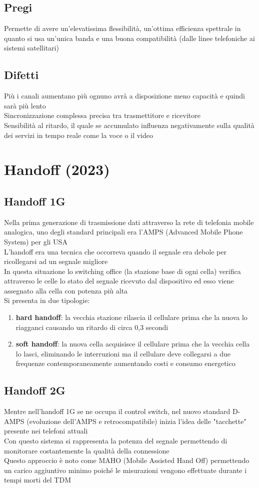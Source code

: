 \documentclass[10pt,oneside,a4paper]{article}
\begin{document}
\subsection{Pregi}
Permette di avere un'elevatissima flessibilità, un'ottima efficienza spettrale in quanto si usa un'unica banda e una buona compatibilità (dalle linee telefoniche ai sistemi satellitari)
\subsection{Difetti}
Più i canali aumentano più ognuno avrà a disposizione meno capacità e quindi sarà più lento\\
Sincronizzazione complessa precisa tra trasmettitore e ricevitore\\
Sensibilità al ritardo, il quale se accumulato influenza negativamente sulla qualità dei servizi in tempo reale come la voce o il video
\section{Handoff (2023)}
\subsection{Handoff 1G}
Nella prima generazione di trasmissione dati attraverso la rete di telefonia mobile analogica, uno degli standard principali era l'AMPS (Advanced Mobile Phone System) per gli USA\\
L'handoff era una tecnica che occorreva quando il segnale era debole per ricollegarsi ad un segnale migliore\\
In questa situazione lo switching office (la stazione base di ogni cella) verifica attraverso le celle lo stato del segnale ricevuto dal dispositivo ed esso viene assegnato alla cella con potenza più alta\\
Si presenta in due tipologie:
\begin{enumerate}
\item \textbf{hard handoff}: la vecchia stazione rilascia il cellulare prima che la nuova lo riagganci causando un ritardo di circa 0,3 secondi
\item \textbf{soft handoff}: la nuova cella acquisisce il cellulare prima che la vecchia cella lo lasci, eliminando le interruzioni ma il cellulare deve collegarsi a due frequenze contemporaneamente aumentando costi e consumo energetico
\end{enumerate}
\subsection{Handoff 2G}
Mentre nell'handoff 1G se ne occupa il control switch, nel nuovo standard D-AMPS (evoluzione dell'AMPS e retrocompatibile) inizia l'idea delle "tacchette" presente nei telefoni attuali\\
Con questo sistema si rappresenta la potenza del segnale permettendo di monitorare costantemente la qualità della connessione\\
Questo approccio è noto come MAHO (Mobile Assisted Hand Off) permettendo un carico aggiuntivo minimo poiché le misurazioni vengono effettuate durante i tempi morti del TDM\\
\end{document}
